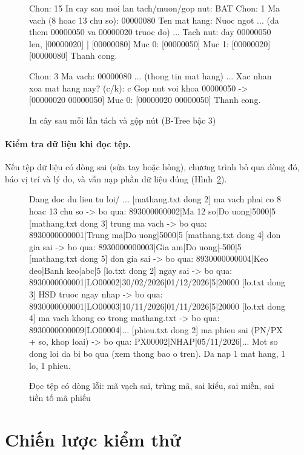 \begin{figure}[htbp]
\begin{manhinh}
Chon: 15
In cay sau moi lan tach/muon/gop nut: BAT
Chon: 1
Ma vach (8 hoac 13 chu so): 00000080
Ten mat hang: Nuoc ngot
   ... (da them 00000050 va 00000020 truoc do) ...
  Tach nut: day 00000050 len, [00000020] | [00000080]
Muc 0: [00000050]
Muc 1: [00000020] [00000080]
Thanh cong.

Chon: 3
Ma vach: 00000080
   ... (thong tin mat hang) ...
Xac nhan xoa mat hang nay? (c/k): c
  Gop nut voi khoa 00000050 -> [00000020 00000050]
Muc 0: [00000020 00000050]
Thanh cong.
\end{manhinh}
\caption{In cây sau mỗi lần tách và gộp nút (B-Tree bậc 3)}
\label{fig:intachgop}
\end{figure}

\paragraph{Kiểm tra dữ liệu khi đọc tệp.} Nếu tệp dữ liệu có dòng sai (sửa tay hoặc hỏng), chương trình bỏ qua
dòng đó, báo vị trí và lý do, và vẫn nạp phần dữ liệu đúng (Hình~\ref{fig:doctep}).

\begin{figure}[htbp]
\begin{manhinh}
Dang doc du lieu tu loi/ ...
  [mathang.txt dong 2] ma vach phai co 8 hoac 13 chu so -> bo qua: 893000000002|Ma 12 so|Do uong|5000|5
  [mathang.txt dong 3] trung ma vach -> bo qua: 8930000000001|Trung ma|Do uong|5000|5
  [mathang.txt dong 4] don gia sai -> bo qua: 8930000000003|Gia am|Do uong|-500|5
  [mathang.txt dong 5] don gia sai -> bo qua: 8930000000004|Keo deo|Banh keo|abc|5
  [lo.txt dong 2] ngay sai -> bo qua: 8930000000001|LO00002|30/02/2026|01/12/2026|5|20000
  [lo.txt dong 3] HSD truoc ngay nhap -> bo qua: 8930000000001|LO00003|10/11/2026|01/11/2026|5|20000
  [lo.txt dong 4] ma vach khong co trong mathang.txt -> bo qua: 8930000000009|LO00004|...
  [phieu.txt dong 2] ma phieu sai (PN/PX + so, khop loai) -> bo qua: PX00002|NHAP|05/11/2026|...
Mot so dong loi da bi bo qua (xem thong bao o tren).
Da nap 1 mat hang, 1 lo, 1 phieu.
\end{manhinh}
\caption{Đọc tệp có dòng lỗi: mã vạch sai, trùng mã, sai kiểu, sai miền, sai tiền tố mã phiếu}
\label{fig:doctep}
\end{figure}

\section{Chiến lược kiểm thử}

